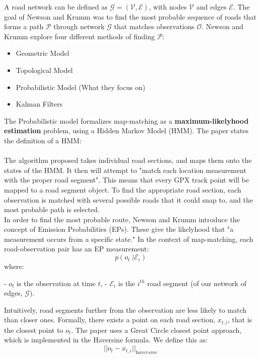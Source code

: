 \documentclass[12pt,a4paper]{report}
\begin{document}
A road network can be defined as $\mathcal{G} = (\mathcal{V}, \mathcal{E})$, with nodes $\mathcal{V}$ and edges $\mathcal{E}$. The goal of Newson and Krumm
was to find the most probable sequence of roads that forms a path $\mathcal{P}$ through network $\mathcal{G}$ that matches observations $\mathcal{O}$.
Newson and Krumm explore four different methods of finding $\mathcal{P}$:
\begin{itemize}
	\item Geometric Model
	\item Topological Model
	\item Probabilistic Model (What they focus on)
	\item Kalman Filters
\end{itemize}
The Probabilistic model formalizes map-matching as a \textbf{maximum-likelyhood estimation} problem, using a Hidden Markov Model (HMM).
The paper states the definition of a HMM:\\
\\
The algorithm proposed takes individual road sections, and maps them onto the states of the HMM. It then will attempt to "match each location measurement
with the proper road segment".  This means that every GPX track point will be mapped to a road segment object.
To find the appropriate road section, each observation is matched with several possible roads that it could snap to, and the most probable path is
selected.\\
In order to find the most probable route, Newson and Krumm introduce the concept of Emission Probabilities (EPs). These give the likelyhood that "a measurement occurs from a specific state."
In the context of map-matching, each road-observation pair has an EP measurement:
\[
	p(o_t \;| \mathcal{E}_i)
\]
where:
\begin{itemize}
	- $o_t$ is the observation at time $t$,
	- $\mathcal{E}_i$ is the $i^{th}$ road segment (of our network of edges, $\mathcal{G}$).
\end{itemize}
Intuitively, road segments further from the observation are less likely to match than closer ones.
Formally, there exists a point on each road section, $x_{t,i}$, that is the closest point to $o_t$.
The paper uses a Great Circle closest point approach, which is implemented in the Haversine formula.
We define this as:
\[
	||o_t - x_{t,i}||_{\textit{haversine}}
\]
\end{document}
